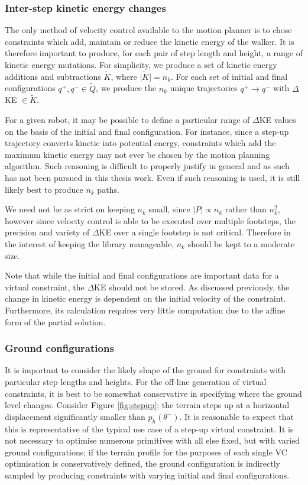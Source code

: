 \subsubsection{Inter-step kinetic energy changes}
The only method of velocity control available to the motion planner is to chose constraints which add, maintain or reduce the kinetic energy of the walker. It is therefore important to produce, for each pair of step length and height, a range of kinetic energy mutations. For simplicity, we produce a set of kinetic energy additions and subtractions $\tilde{K}$, where $\lvert\tilde{K}\rvert = n_k$. For each set of initial and final configurations $q^+,q^- \in \tilde{Q}$, we produce the $n_k$ unique trajectories $q^+ \to q^-$ with $\Delta$KE $\in \tilde{K}$.

For a given robot, it may be possible to define a particular range of $\Delta$KE values on the basis of the initial and final configuration. For instance, since a step-up trajectory converts kinetic into potential energy, constraints which add the maximum kinetic energy may not ever be chosen by the motion planning algorithm. Such reasoning is difficult to properly justify in general and as such has not been pursued in this thesis work. Even if such reasoning is used, it is still likely best to produce $n_k$ paths.

We need not be as strict on keeping $n_k$ small, since $\lvert P \rvert \propto n_k$ rather than $n_k^2$, however since velocity control is able to be executed over multiple footsteps, the precision and variety of $\Delta$KE over a single footstep is not critical. Therefore in the interest of keeping the library manageable, $n_k$ should be kept to a moderate size.

Note that while the initial and final configurations are important data for a virtual constraint, the $\Delta$KE should not be stored. As discussed previously, the change in kinetic energy is dependent on the initial velocity of the constraint. Furthermore, its calculation requires very little computation due to the affine form of the partial solution.

\subsubsection{Ground configurations}
It is important to consider the likely shape of the ground for constraints with particular step lengths and heights. For the off-line generation of virtual constraints, it is best to be somewhat conservative in specifying where the ground level changes. Consider Figure \ref{fig:stepup}; the terrain steps up at a horizontal displacement significantly smaller than $p_h(\theta^-)$. It is reasonable to expect that this is representative of the typical use case of a step-up virtual constraint. It is not necessary to optimise numerous primitives with all else fixed, but with varied ground configurations; if the terrain profile for the purposes of each single VC optimisation is conservatively defined, the ground configuration is indirectly sampled by producing constraints with varying initial and final configurations.

